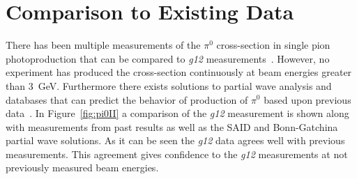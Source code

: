 \documentclass{aip-cp}
\def\g12{\emph{g12}}
\begin{document}
\section{Comparison to Existing Data}
There has been multiple measurements of the $\pi^0$ cross-section in single pion photoproduction that can be compared to \g12 measurements~\cite{Dugger07,ELSA05,ELSA11,Graal,LEPS,brem}. However, no experiment has produced the cross-section continuously at beam energies greater than 3~GeV. Furthermore there exists solutions to partial wave analysis and databases that can predict the behavior of production of $\pi^0$ based upon previous data~\cite{BonnGat,SAID}. In Figure~\ref{fig:pi0II} a comparison of the \g12 measurement is shown along with measurements from past results as well as the SAID and Bonn-Gatchina partial wave solutions. As it can be seen the \g12 data agrees well with previous measurements. This agreement gives confidence to the \g12 measurements at not previously measured beam energies. 
\end{document}
